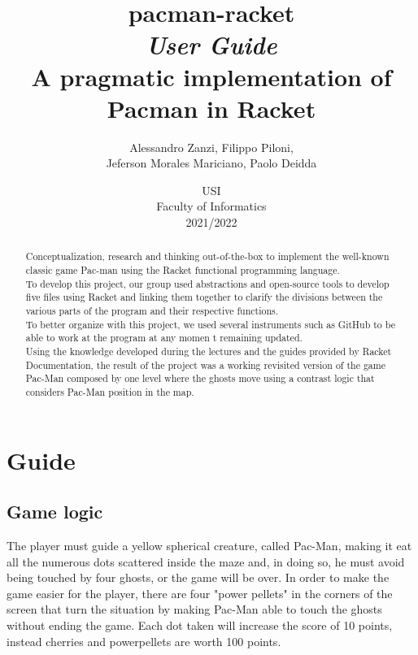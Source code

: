 \documentclass{article}
\title{
\textbf{pacman-racket} \\
\textit{User Guide}\\
A pragmatic implementation of Pacman in Racket\\
}
\author{
    Alessandro Zanzi,
    Filippo Piloni,\\
    Jeferson Morales Mariciano,
    Paolo Deidda
}
\date{
USI \\
Faculty of Informatics \\
[\baselineskip]  2021/2022
}
\begin{document}
\begin{titlepage}
\maketitle  

\end{titlepage}
  \begin{abstract}
Conceptualization, research and thinking out-of-the-box
to implement the well-known classic game Pac-man
using the Racket functional programming language.\\
To develop this project, our group used abstractions and open-source tools to develop five files using Racket and linking them together to clarify the divisions between the various parts of the program and their respective functions.\\
To better organize with this project, we used several instruments such as GitHub to be able to work at the program at any momen t remaining updated.\\
Using the knowledge developed during the lectures and the guides provided by Racket Documentation, the result of the project was a working revisited version of the game Pac-Man composed by one level where the ghosts move using a contrast logic that considers Pac-Man position in the map.

 \end{abstract}
 \clearpage
  \tableofcontents
 \clearpage

\section{Guide}

\subsection{Game logic}
 The player must guide a yellow spherical creature, called Pac-Man, making it eat all the numerous dots scattered inside the maze and, in doing so, he must avoid being touched by four ghosts, or the game will be over. In order to make the game easier for the player, there are four "power pellets" in the corners of the screen that turn the situation by making Pac-Man able to touch the ghosts without ending the game. Each dot taken will increase the score of 10 points, instead cherries and powerpellets are worth 100 points.
\end{document}
